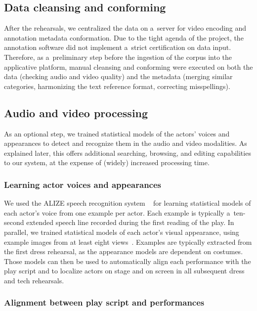 \documentclass[conference]{IEEEtran}
\newcommand{\todo}[1]{\noindent\textcolor{red}{{\bf \{ToDo} #1{\bf \}}}}
\begin{document}
\subsection{Data cleansing and conforming}
After the rehearsals, we centralized the data on a~server for video encoding and annotation metadata conformation. Due to the tight agenda of the project, the annotation software did not implement a~strict certification on data input. Therefore, as a~preliminary step before the ingestion of the corpus into the applicative platform, manual cleansing and conforming were executed on both the data (checking audio and video quality) and the metadata (merging similar categories, harmonizing the text reference format, correcting misspellings).

\subsection{Audio and video processing}
As an optional step, we trained statistical models of the actors' voices and appearances to detect and recognize them in the audio and video modalities. As explained later, this offers additional searching, browsing, and editing capabilities to our system, at the expense of (widely) increased processing time.

\subsubsection{Learning actor voices and appearances}
We used the ALIZE speech recognition system ~\cite{Bonastre05} for learning statistical models of each actor's voice from one example per actor. Each example is typically a~ten-second extended speech line recorded during the first reading of the play. In parallel, we trained statistical models of each actor's visual appearance, using example images from at least eight views~\cite{Gandhi13,Gandhi15}. Examples are typically extracted from the first dress rehearsal, as the appearance models are dependent on costumes.  Those models can then be used to automatically align each performance with the play script and to localize actors on stage and on screen in all subsequent dress and tech rehearsals. 

\subsubsection{Alignment between play script and performances}
\end{document}
